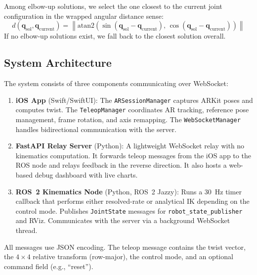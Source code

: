 Among elbow-up solutions, we select the one closest to the current joint configuration in the wrapped angular distance sense:
\begin{equation}
    d(\mathbf{q}_\text{sol}, \mathbf{q}_\text{current}) = \left\| \text{atan2}\!\left(\sin(\mathbf{q}_\text{sol} - \mathbf{q}_\text{current}),\, \cos(\mathbf{q}_\text{sol} - \mathbf{q}_\text{current})\right) \right\|
\end{equation}
If no elbow-up solutions exist, we fall back to the closest solution overall.


\subsection{System Architecture}

The system consists of three components communicating over WebSocket:

\begin{enumerate}
    \item \textbf{iOS App} (Swift/SwiftUI): The \texttt{ARSessionManager} captures ARKit poses and computes twist. The \texttt{TeleopManager} coordinates AR tracking, reference pose management, frame rotation, and axis remapping. The \texttt{WebSocketManager} handles bidirectional communication with the server.

    \item \textbf{FastAPI Relay Server} (Python): A lightweight WebSocket relay with no kinematics computation. It forwards teleop messages from the iOS app to the ROS node and relays feedback in the reverse direction. It also hosts a web-based debug dashboard with live charts.

    \item \textbf{ROS~2 Kinematics Node} (Python, ROS~2 Jazzy): Runs a 30~Hz timer callback that performs either resolved-rate or analytical IK depending on the control mode. Publishes \texttt{JointState} messages for \texttt{robot\_state\_publisher} and RViz. Communicates with the server via a background WebSocket thread.
\end{enumerate}

All messages use JSON encoding. The teleop message contains the twist vector, the $4 \times 4$ relative transform (row-major), the control mode, and an optional command field (e.g., ``reset'').

